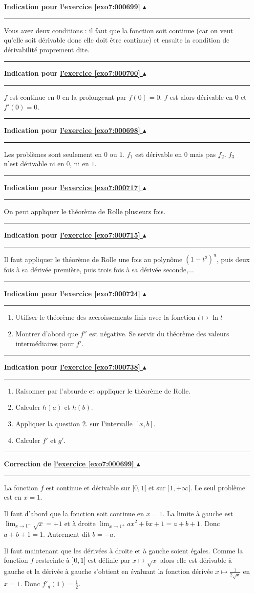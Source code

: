 \documentclass[11pt,a4paper]{article}
\newcommand{\noindication}{}
\newcounter{exo}
\newcommand{\indication}[1]{\hypertarget{ind7:#1}{}\label{ind7:#1}{\bf Indication pour \hyperlink{exo7:#1}{l'exercice \ref{exo7:#1} $\blacktriangle$}}\vspace{1mm}\hrule\vspace{1mm}}
\newcommand{\finindication}{\vspace{1mm}\hrule\vspace*{7mm}}
\newcommand{\correction}[1]{\hypertarget{cor7:#1}{}\label{cor7:#1}{\bf Correction de \hyperlink{exo7:#1}{l'exercice \ref{exo7:#1} $\blacktriangle$}}\vspace{1mm}\hrule\vspace{1mm}}
\newcommand{\finenonces}{\newpage}
\newcommand{\finindications}{\newpage}
\begin{document}
 \finenonces 



 \finindications 

\indication{000699}
Vous avez deux conditions : il faut que la fonction soit continue (car on veut qu'elle soit d\'erivable donc elle doit \^etre continue) et ensuite la condition de d\'erivabilit\'e proprement dite.
\finindication
\indication{000700}
$f$ est continue en $0$ en la prolongeant par $f(0)=0$.
$f$ est alors d\'erivable en $0$ et $f'(0)=0$.
\finindication
\indication{000698}
Les probl\`emes sont seulement en $0$ ou $1$. 
$f_1$ est d\'erivable en $0$ mais pas $f_2$.  $f_3$ n'est dérivable ni en $0$, ni en $1$.
\finindication
\noindication
\indication{000717}
On peut appliquer le th\'eor\`eme de Rolle plusieurs fois.
\finindication
\indication{000715}
Il faut appliquer le th\'eor\`eme de Rolle une fois au polyn\^ome $(1-t^2)^n$,
puis deux fois \`a sa d\'eriv\'ee premi\`ere, puis trois fois \`a sa d\'eriv\'ee seconde,...
\finindication
\noindication
\indication{000724}
\begin{enumerate}
    \item Utiliser le th\'eor\`eme des accroissements finis avec la fonction $t \mapsto \ln t$
    \item Montrer d'abord que $f''$ est n\'egative. Se servir du th\'eor\`eme des valeurs interm\'ediaires pour $f'$.
\end{enumerate}
\finindication
\noindication
\indication{000738}
\begin{enumerate}
 \item Raisonner par l'absurde et appliquer le th\'eor\`eme de Rolle.
 \item Calculer $h(a)$ et $h(b)$.
 \item Appliquer la question 2. sur l'intervalle $[x,b]$.
 \item Calculer $f'$ et $g'$.
\end{enumerate}
\finindication
\noindication


\newpage

\correction{000699}
La fonction $f$ est continue et dérivable sur $]0,1[$ et sur
$]1,+\infty[$. Le seul problème est en $x=1$.

Il faut d'abord que la fonction soit continue en $x=1$.
La limite \`a gauche est
$\lim_{x\rightarrow 1^-} \sqrt x = +1$
et \`a droite 
$\lim_{x\rightarrow 1^+} ax^2+bx+1 = a+b+1$.
Donc  $a+b+1=1$. Autrement dit $b = -a$.

Il faut maintenant que les d\'eriv\'ees \`a droite et \`a gauche soient
\'egales.
Comme la fonction $f$ restreinte à $]0,1]$ est définie par $x \mapsto \sqrt{x}$ alors elle est dérivable
à gauche et la dérivée à gauche s'obtient en évaluant la fonction dérivée $x \mapsto \frac{1}{2\sqrt x}$
en $x=1$. Donc $f'_g(1)=\frac 12$.
\end{document}
